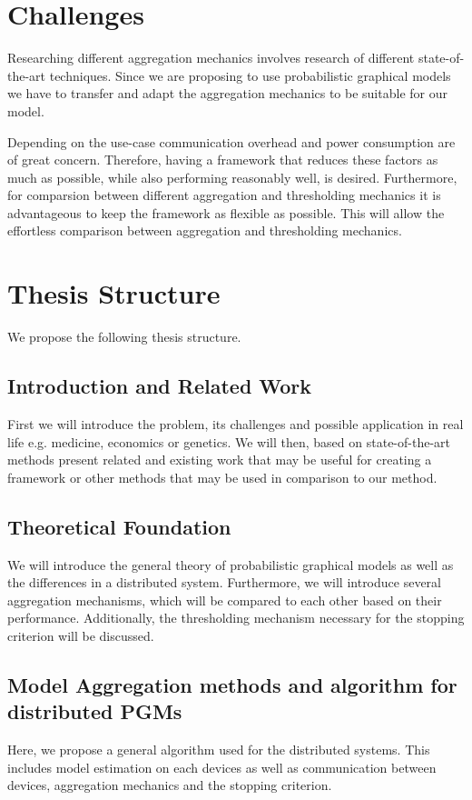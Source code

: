   \section{Challenges}
  Researching different aggregation mechanics involves research of different state-of-the-art techniques.
  Since we are proposing to use probabilistic graphical models we have to transfer and adapt the aggregation mechanics to be suitable for our model.

  Depending on the use-case communication overhead and power consumption are of great concern. 
  Therefore, having a framework that reduces these factors as much as possible, while also performing reasonably well, is desired.
  Furthermore, for comparsion between different aggregation and thresholding mechanics it is advantageous to keep the framework as flexible as possible.
  This will allow the effortless comparison between aggregation and thresholding mechanics. 

   
  \section{Thesis Structure}
    We propose the following thesis structure.
    
  \subsection{Introduction and Related Work}
    First we will introduce the problem, its challenges and possible application in real life e.g. medicine, economics or genetics. We will then, based on state-of-the-art methods present related and existing work that may be useful for creating a framework or other methods that may be used in comparison to our method.

  \subsection{Theoretical Foundation}
    We will introduce the general theory of probabilistic graphical models as well as the differences in a distributed system. 
    Furthermore, we will introduce several aggregation mechanisms, which will be compared to each other based on their performance.
    Additionally, the thresholding mechanism necessary for the  stopping criterion will be discussed. 

  \subsection{Model Aggregation methods and algorithm for distributed PGMs}
    Here, we propose a general algorithm used for the distributed systems.
    This includes model estimation on each devices as well as communication between devices, aggregation mechanics and the stopping criterion.

